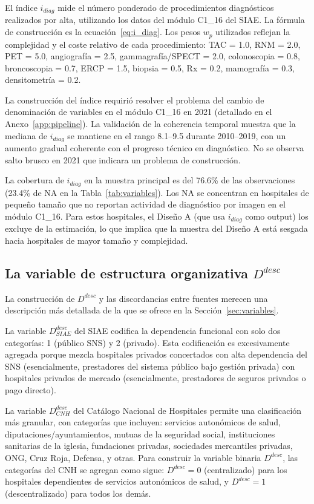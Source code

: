 \documentclass[12pt, a4paper, twoside, openright]{book}
\theoremstyle{plain}
\theoremstyle{definition}
\theoremstyle{remark}
\begin{document}
El índice $i_{diag}$ mide el número ponderado de procedimientos diagnósticos realizados por alta, utilizando los datos del módulo C1\_16 del SIAE. La fórmula de construcción es la ecuación~\eqref{eq:i_diag}. Los pesos $w_p$ utilizados reflejan la complejidad y el coste relativo de cada procedimiento: TAC = 1.0, RNM = 2.0, PET = 5.0, angiografía = 2.5, gammagrafía/SPECT = 2.0, colonoscopia = 0.8, broncoscopia = 0.7, ERCP = 1.5, biopsia = 0.5, Rx = 0.2, mamografía = 0.3, densitometría = 0.2.

La construcción del índice requirió resolver el problema del cambio de denominación de variables en el módulo C1\_16 en 2021 (detallado en el Anexo~\ref{app:pipeline}). La validación de la coherencia temporal muestra que la mediana de $i_{diag}$ se mantiene en el rango 8.1--9.5 durante 2010--2019, con un aumento gradual coherente con el progreso técnico en diagnóstico. No se observa salto brusco en 2021 que indicara un problema de construcción.

La cobertura de $i_{diag}$ en la muestra principal es del 76.6\% de las observaciones (23.4\% de NA en la Tabla~\ref{tab:variables}). Los NA se concentran en hospitales de pequeño tamaño que no reportan actividad de diagnóstico por imagen en el módulo C1\_16. Para estos hospitales, el Diseño A (que usa $i_{diag}$ como output) los excluye de la estimación, lo que implica que la muestra del Diseño A está sesgada hacia hospitales de mayor tamaño y complejidad.

\subsection{La variable de estructura organizativa \texorpdfstring{$D^{desc}$}{D\^{}desc}}

La construcción de $D^{desc}$ y las discordancias entre fuentes merecen una descripción más detallada de la que se ofrece en la Sección~\ref{sec:variables}.

La variable $D^{desc}_{SIAE}$ del SIAE codifica la dependencia funcional con solo dos categorías: 1 (público SNS) y 2 (privado). Esta codificación es excesivamente agregada porque mezcla hospitales privados concertados con alta dependencia del SNS (esencialmente, prestadores del sistema público bajo gestión privada) con hospitales privados de mercado (esencialmente, prestadores de seguros privados o pago directo).

La variable $D^{desc}_{CNH}$ del Catálogo Nacional de Hospitales permite una clasificación más granular, con categorías que incluyen: servicios autonómicos de salud, diputaciones/ayuntamientos, mutuas de la seguridad social, instituciones sanitarias de la iglesia, fundaciones privadas, sociedades mercantiles privadas, ONG, Cruz Roja, Defensa, y otras. Para construir la variable binaria $D^{desc}$, las categorías del CNH se agregan como sigue: $D^{desc} = 0$ (centralizado) para los hospitales dependientes de servicios autonómicos de salud, y $D^{desc} = 1$ (descentralizado) para todos los demás.
\end{document}
